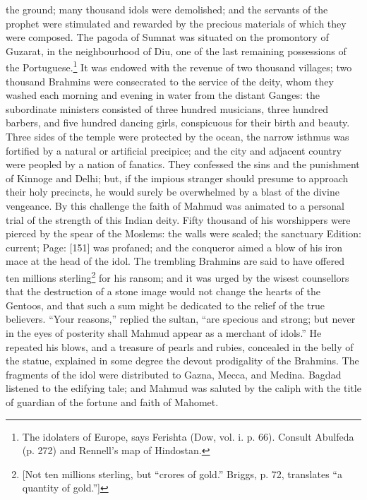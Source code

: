 the ground; many thousand idols were demolished; and the servants of the prophet were stimulated and rewarded by the precious materials of which they were composed. The pagoda of Sumnat was situated on the promontory of Guzarat, in the neighbourhood of Diu, one of the last remaining possessions of the Portuguese.\footnote{The idolaters of Europe, says Ferishta (Dow, vol. i. p. 66). Consult Abulfeda (p. 272) and Rennell\texthebrew{}’s map of Hindostan.} It was endowed with the revenue of two thousand villages; two thousand Brahmins were consecrated to the service of the deity, whom they washed each morning and evening in water from the distant Ganges: the subordinate ministers consisted of three hundred musicians, three hundred barbers, and five hundred dancing girls, conspicuous for their birth and beauty. Three sides of the temple were protected by the ocean, the narrow isthmus was fortified by a natural or artificial precipice; and the city and adjacent country were peopled by a nation of fanatics. They confessed the sins and the punishment of Kinnoge and Delhi; but, if the impious stranger should presume to approach their holy precincts, he would surely be overwhelmed by a blast of the divine vengeance. By this challenge the faith of Mahmud was animated to a personal trial of the strength of this Indian deity. Fifty thousand of his worshippers were pierced by the spear of the Moslems: the walls were scaled; the sanctuary Edition: current; Page: [151] was profaned; and the conqueror aimed a blow of his iron mace at the head of the idol. The trembling Brahmins are said to have offered ten millions sterling\footnote{[Not ten millions sterling, but \texthebrew{“}crores of gold.\texthebrew{}” Briggs, p. 72, translates \texthebrew{“}a quantity of gold.\texthebrew{}”]} for his ransom; and it was urged by the wisest counsellors that the destruction of a stone image would not change the hearts of the Gentoos, and that such a sum might be dedicated to the relief of the true believers. \texthebrew{“}Your reasons,\texthebrew{}” replied the sultan, \texthebrew{“}are specious and strong; but never in the eyes of posterity shall Mahmud appear as a merchant of idols.\texthebrew{}” He repeated his blows, and a treasure of pearls and rubies, concealed in the belly of the statue, explained in some degree the devout prodigality of the Brahmins. The fragments of the idol were distributed to Gazna, Mecca, and Medina. Bagdad listened to the edifying tale; and Mahmud was saluted by the caliph with the title of guardian of the fortune and faith of Mahomet.

